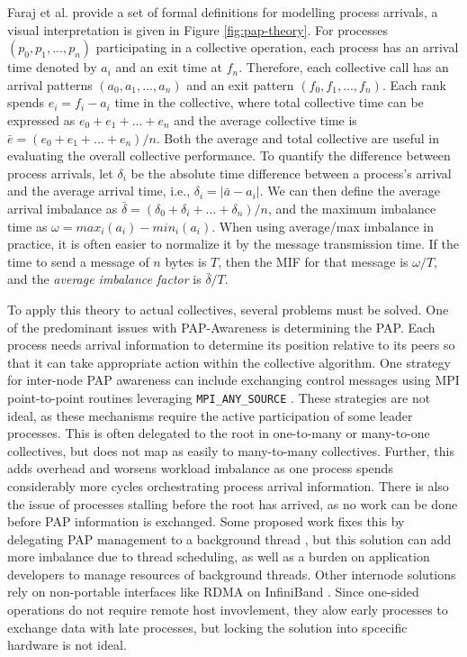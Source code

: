 Faraj et al. \cite{Faraj2008StudyProcArrivalMPIColl} provide a set of formal definitions for modelling process arrivals, a visual interpretation is given in Figure \ref{fig:pap-theory}.
For processes $(p_0, p_1,...,p_n)$ participating in a collective operation, each process has an arrival time denoted by $a_i$ and an exit time at $f_n$.
Therefore, each collective call has an arrival patterns $(a_0, a_1, ..., a_n)$ and an exit pattern $(f_0, f_1, ..., f_n)$.
Each rank spends $e_i = f_i - a_i$ time in the collective, where total collective time can be expressed as $e_0 + e_1 + ... + e_n$ and the average collective time is $\bar{e} = (e_0 + e_1 + ... + e_n)/n$.
Both the average and total collective are useful in evaluating the overall collective performance.
To quantify the difference between process arrivals, let $\delta_i$ be the absolute time difference between a process's arrival and the average arrival time, i.e., $\delta_i = |\bar{a} - a_i|$. 
We can then define the average arrival imbalance as $\bar{\delta}=(\delta_0 + \delta_i + ... + \delta_n)/n$, and the maximum imbalance time as $\omega = max_i(a_i)-min_i(a_i)$.
When using average/max imbalance in practice, it is often easier to normalize it by the message transmission time.
If the time to send a message of $n$ bytes is $T$, then the \gls{MIF} for that message is $\omega/T$, and the \textit{average imbalance factor} is $\bar{\delta}/T$.

To apply this theory to actual collectives, several problems must be solved.
One of the predominant issues with \gls{PAP}-Awareness is determining the \gls{PAP}.
Each process needs arrival information to determine its position relative to its peers so that it can take appropriate action within the collective algorithm. 
One strategy for inter-node \gls{PAP} awareness can include exchanging control messages using \gls{MPI} point-to-point routines leveraging \texttt{MPI\_ANY\_SOURCE} \cite{Patarasuk2008EffBcastDifProcArr}.
These strategies are not ideal, as these mechanisms require the active participation of some leader processes.
This is often delegated to the root in one-to-many or many-to-one collectives, but does not map as easily to many-to-many collectives.
Further, this adds overhead and worsens workload imbalance as one process spends considerably more cycles orchestrating process arrival information.
There is also the issue of processes stalling before the root has arrived, as no work can be done before \gls{PAP} information is exchanged.
Some proposed work fixes this by delegating \gls{PAP} management to a background thread \cite{Proficz2018ImprvAllReduceForImbPAP, Proficz2020PAPAwareScatterGather, Proficz2021AllGatherResilientToImbPAP, Faraj2008StudyProcArrivalMPIColl}, but this solution can add more imbalance due to thread scheduling, as well as a burden on application developers to manage resources of background threads.
Other internode solutions rely on non-portable interfaces like \gls{RDMA} on InfiniBand \cite{Qian2009ProcArrivalSHMA2AIB}.
Since one-sided operations do not require remote host invovlement, they alow early processes to exchange data with late processes, but locking the solution into spcecific hardware is not ideal.

